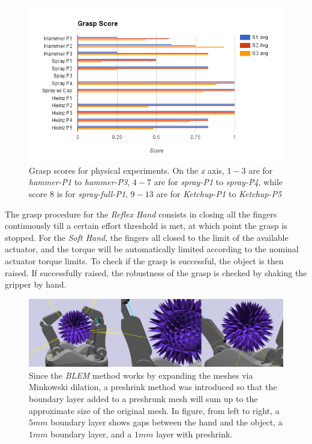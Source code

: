 \begin{figure}[!hbt]
\begin{center}
        \includegraphics[width=0.95\columnwidth]     {images/ssoch/real_score}
        \caption{Grasp scores for physical experiments. On the \emph{x} axis, $1-3$ are for \emph{hammer-P1} to \emph{hammer-P3}, $4-7$ are for \emph{spray-P1} to \emph{spray-P4}, while score $8$ is for \emph{spray-full-P1}, $9-13$ are for \emph{Ketchup-P1} to \emph{Ketchup-P5}}
        \label{real_score}
        \end{center}
\end{figure}

The grasp procedure for the \emph{Reflex Hand} consists in closing all the fingers continuously till a certain effort threshold is met, at which point the grasp is stopped. For the \emph{Soft Hand}, the fingers all closed to the limit of the available actuator, and the torque will be automatically limited according to the nominal actuator torque limits. To check if the grasp is successful, the object is then  raised. If successfully raised, the robustness of the grasp is checked by shaking the gripper by hand.


\begin{figure}[!hbt]
\begin{center}
        \includegraphics[width=0.95\columnwidth]     {images/ssoch/preshrink}
        \caption{Since the \emph{BLEM} method works by expanding the meshes via Minkowski dilation, a preshrink method was introduced so that the boundary layer added to a preshrunk mesh will sum up to the approximate size of the original mesh. In figure, from left to right, a $5mm$ boundary layer shows gaps between the hand and the object, a $1mm$ boundary layer, and a $1mm$ layer with preshrink. }
        \label{Preshrink}
        \end{center}
\end{figure}


